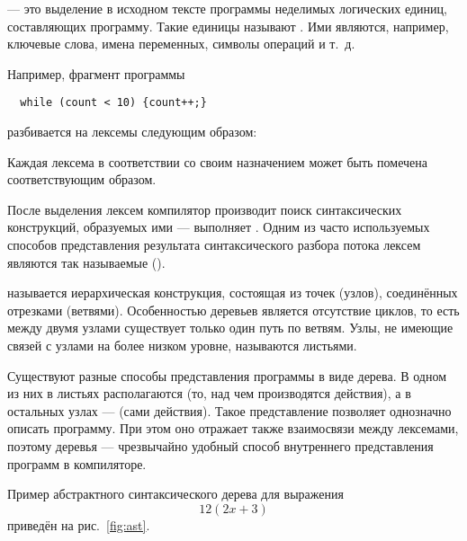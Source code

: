 
 — это выделение в
исходном тексте программы неделимых логических единиц, составляющих
программу. Такие единицы называют . Ими
являются, например, ключевые слова, имена переменных, символы операций
и т.~д.

Например, фрагмент программы
\begin{lstlisting}
  while (count < 10) {count++;}
\end{lstlisting}
разбивается на лексемы следующим образом:


Каждая лексема в соответствии со своим назначением может быть
помечена соответствующим образом.


После выделения лексем компилятор производит поиск синтаксических
конструкций, образуемых ими — выполняет
. Одним из часто
используемых способов представления результата синтаксического разбора
потока лексем являются так называемые 
().

 называется иерархическая конструкция, состоящая
из точек (узлов), соединённых отрезками (ветвями). Особенностью
деревьев является отсутствие циклов, то есть между двумя узлами
существует только один путь по ветвям. Узлы, не имеющие связей с
узлами на более низком уровне, называются листьями.

Существуют разные способы представления программы в виде дерева. В
одном из них в листьях располагаются  (то, над
чем производятся действия), а в остальных узлах —
 (сами действия). Такое представление
позволяет однозначно описать программу. При этом оно отражает также
взаимосвязи между лексемами, поэтому деревья — чрезвычайно удобный
способ внутреннего представления программ в компиляторе.

Пример абстрактного синтаксического дерева для выражения
\[
12(2x+3)
\]
приведён на рис.~\ref{fig:ast}.

